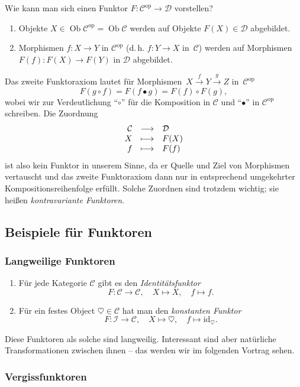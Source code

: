 \documentclass[a4paper,ngerman]{scrartcl}
\theoremstyle{definition}
\theoremstyle{plain}
\theoremstyle{remark}
\newcommand{\xra}[1]{\xrightarrow{#1}}
\newcommand{\I}{\mathcal{I}}
\newcommand{\C}{\mathcal{C}}
\newcommand{\D}{\mathcal{D}}
\newcommand{\id}{\mathrm{id}}
\DeclareMathOperator{\Ob}{Ob}
\newcommand{\op}{\mathrm{op}}
\begin{document}
Wie kann man sich einen Funktor $F : \C^\op \to \D$ vorstellen?
\begin{enumerate}
  \item Objekte $X \in \Ob \C^\op = \Ob \C$ werden auf Objekte $F(X) \in \mathcal{D}$
  abgebildet.
  \item Morphismen $f : X \to Y$ in $\C^\op$ (d.\,h. $f : Y \to X$ in~$\C$)
  werden auf Morphismen $F(f) : F(X) \to F(Y)$ in $\mathcal{D}$ abgebildet.
\end{enumerate}
Das zweite Funktoraxiom lautet für Morphismen~$X \xra{f} Y \xra{g} Z$
in~$\C^\op$
\[ F(g \circ f) = F(f \bullet g) = F(f) \circ F(g), \] 
wobei wir zur Verdeutlichung "`$\circ$"' für die Komposition in $\C$ und
"`$\bullet$"' in $\C^\op$ schreiben. Die Zuordnung
\[ \begin{array}{@{}rcl@{}}
  \C &\longrightarrow& \D \\
  X  &\longmapsto& F(X) \\
  f  &\longmapsto& F(f)
\end{array} \]
ist also kein Funktor in unserem Sinne, da er Quelle und Ziel von Morphismen
vertauscht und das zweite Funktoraxiom dann nur in entsprechend umgekehrter
Kompositionsreihenfolge erfüllt. Solche Zuordnen sind trotzdem wichtig; sie
heißen \emph{kontravariante Funktoren}.


\subsection{Beispiele für Funktoren}

\subsubsection{Langweilige Funktoren}

\begin{enumerate}
  \item Für jede Kategorie $\C$ gibt es den \emph{Identitätsfunktor}
  \[ F : \C \to \C, \quad X \mapsto X, \quad f \mapsto f. \]
  \item Für ein festes Object $\heartsuit \in \C$ hat man den \emph{konstanten Funktor}
  \[ F : \I \to \C, \quad X \mapsto \heartsuit, \quad f \mapsto \id_\heartsuit. \]
\end{enumerate}

Diese Funktoren als solche sind langweilig. Interessant sind aber natürliche
Transformationen zwischen ihnen -- das werden wir im folgenden Vortrag sehen.


\subsubsection{Vergissfunktoren}
\end{document}
